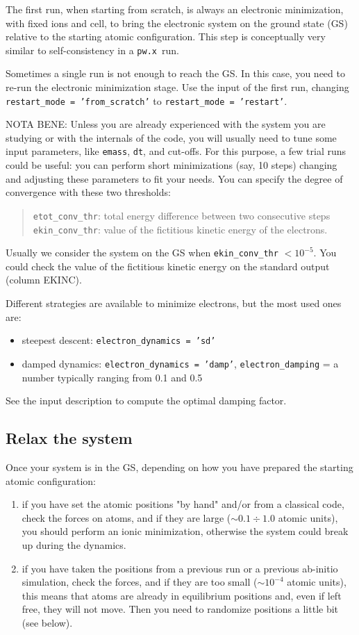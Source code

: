 \documentclass[12pt,a4paper]{article}
\def\pw.x{\texttt{pw.x}}
\begin{document}
The first run, when starting from scratch, is always an electronic 
minimization, with fixed ions and cell, to bring the electronic system on the ground state (GS) relative to the starting atomic configuration. This step is conceptually very similar to
self-consistency in a \pw.x\ run.

Sometimes a single run is not enough to reach the GS. In this case,
you need to re-run the electronic minimization stage. Use the input 
of the first run, changing \texttt{restart\_mode = 'from\_scratch'}
to \texttt{restart\_mode = 'restart'}.
   
NOTA BENE: Unless you are already experienced with the system 
you are studying or with the internals of the code, you will usually need 
to tune some input parameters, like \texttt{emass}, \texttt{dt}, and cut-offs. For this 
purpose, a few trial runs could be useful: you can perform short
minimizations (say, 10 steps) changing and adjusting these parameters 
to fit your needs. You can specify the degree of convergence with these
two thresholds:
\begin{quote}
\texttt{etot\_conv\_thr}: total energy difference between two consecutive steps\\
\texttt{ekin\_conv\_thr}: value of the fictitious kinetic energy of the electrons.
\end{quote}
   
Usually we consider the system on the GS when 
\texttt{ekin\_conv\_thr} $ < 10^{-5}$.
You could check the value of the fictitious kinetic energy on the standard 
output (column EKINC).

Different strategies are available to minimize electrons, but the most used 
ones are:
\begin{itemize}
\item steepest descent: \texttt{electron\_dynamics = 'sd'}
\item damped dynamics: \texttt{electron\_dynamics = 'damp'},
\texttt{electron\_damping} = a number typically ranging from 0.1 and 0.5 
\end{itemize}
See the input description to compute the optimal damping factor.

\subsection{Relax the system}

Once your system is in the GS, depending on how you have prepared the starting
atomic configuration:
\begin{enumerate}
\item
if you have set the atomic positions "by hand" and/or from a classical code, 
check the forces on atoms, and if they are large ($\sim 0.1 \div 1.0$
atomic units), you should perform an ionic minimization, otherwise the
system could break up during the dynamics.
\item
if you have taken the positions from a previous run or a previous ab-initio 
simulation, check the forces, and if they are too small ($\sim 10^{-4}$ 
atomic units), this means that atoms are already in equilibrium positions 
and, even if left free, they will not move. Then you need to randomize 
positions a little bit (see below).
\end{enumerate}
\end{document}
